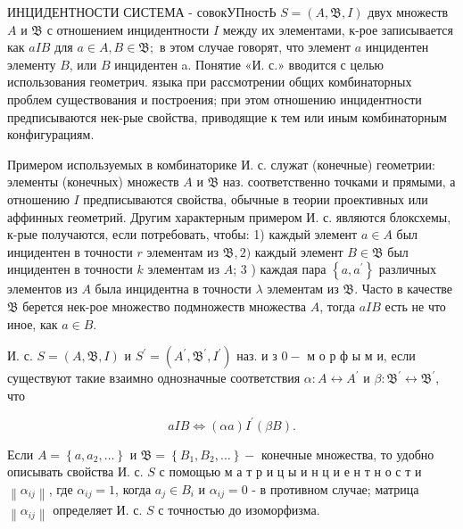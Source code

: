 \documentclass[10pt]{article}
\begin{document}
ИНЦИДЕНТНОСТИ СИСТЕМА - совокУПностЬ $S=(A, \mathfrak{B}, I)$ двух множеств $A$ и $\mathfrak{B}$ с отношением инцидентности $I$ между их элементами, к-рое записывается как $a I B$ для $a \in A, B \in \mathfrak{B} ;$ в этом случае говорят, что элемент $a$ инцидентен элементу $B$, или $B$ инцидентен a. Понятие «И. с.» вводится с целью использования геометрич. языка при рассмотрении общих комбинаторных проблем существования и построения; при этом отношению инцидентности предписываются нек-рые свойства, приводящие к тем или иным комбинаторным конфигурациям.



Примером используемых в комбинаторике И. с. служат (конечные) геометрии: элементы (конечных) множеств $A$ и $\mathfrak{B}$ наз. соответственно точками и прямыми, а отношению $I$ предписываются свойства, обычные в теории проективных или аффинных геометрий. Другим характерным примером И. с. являются блоксхемы, к-рые получаются, если потребовать, чтобы: 1) каждый элемент $a \in A$ был инцидентен в точности $r$ элементам из $\mathfrak{B}, 2)$ каждый элемент $B \in \mathfrak{B}$ был инцидентен в точности $k$ элементам из $A$; 3 ) каждая пара $\left\{a, a^{\prime}\right\}$ различных элементов из $A$ была инцидентна в точности $\lambda$ элементам из $\mathfrak{B}$. Часто в качестве $\mathfrak{B}$ берется нек-рое множество подмножеств множества $A$, тогда $a I B$ есть не что иное, как $a \in B$.



И. с. $S=(A, \mathfrak{B}, I)$ и $S^{\prime}=\left(A^{\prime}, \mathfrak{B}^{\prime}, I^{\prime}\right)$ наз. и з $0-$ м о р ф ы м и, если существуют такие взаимно однозначные соответствия $\alpha: A \leftrightarrow A^{\prime}$ и $\beta: \mathfrak{B}^{\prime} \leftrightarrow \mathfrak{B}^{\prime}$, что



\[

a I B \Leftrightarrow(\alpha a) I^{\prime}(\beta B) .

\]



Если $A=\left\{a, a_{2}, \ldots\right\}$ и $\mathfrak{B}=\left\{B_{1}, B_{2}, \ldots\right\}-$ конечные множества, то удобно описывать свойства И. с. $S$ с помощью м а т р и ц ы и н ц и е н т н о с т и $\left\|\alpha_{i j}\right\|$, где $\alpha_{i j}=1$, когда $a_{j} \in B_{i}$ и $\alpha_{i j}=0$ - в противном случае; матрица $\left\|\alpha_{i j}\right\|$ определяет И. с. $S$ с точностью до изоморфизма.
\end{document}
